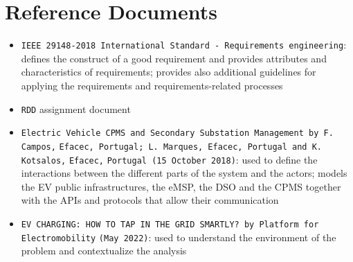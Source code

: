 \section{Reference Documents}
\label{sec:Reference Documents}%
\begin{itemize}
    \item \verb|IEEE 29148-2018 International Standard - Requirements engineering|: defines the construct of a good requirement and provides attributes and characteristics of requirements; provides also additional guidelines for applying the requirements and requirements-related processes
    \item \verb|RDD| assignment document
    \item \verb|Electric Vehicle CPMS and Secondary Substation Management by F. Campos,| \verb|Efacec, Portugal; L. Marques, Efacec, Portugal and K. Kotsalos,| \verb|Efacec,| \verb|Portugal (15 October 2018)|: used to define the interactions between the different parts of the system and the actors; models the EV public infrastructures, the eMSP, the DSO and the CPMS together with the APIs and protocols that allow their communication
    \item \verb|EV CHARGING: HOW TO TAP IN THE GRID SMARTLY? by Platform |\verb|for|\\\verb|Electromobility| \verb|(May 2022)|: used to understand the environment of the problem and contextualize the analysis
\end{itemize}

